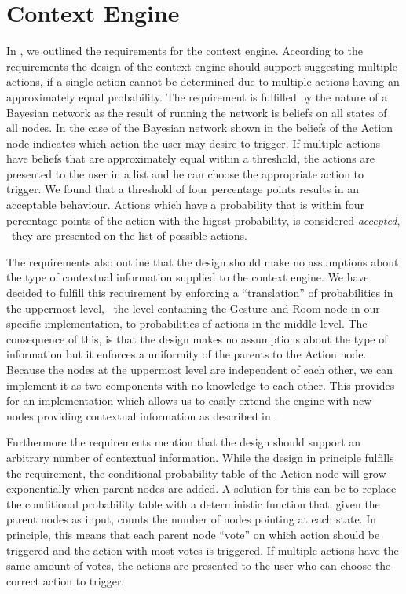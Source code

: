 \section{Context Engine}
\label{sec:design:context-engine}

In , we outlined the requirements for the context engine. According to the requirements the design of the context engine should support suggesting multiple actions, if a single action cannot be determined due to multiple actions having an approximately equal probability. The requirement is fulfilled by the nature of a Bayesian network as the result of running the network is beliefs on all states of all nodes. In the case of the Bayesian network shown in  the beliefs of the Action node indicates which action the user may desire to trigger.
If multiple actions have beliefs that are approximately equal within a threshold, the actions are presented to the user in a list and he can choose the appropriate action to trigger. We found that a threshold of four percentage points results in an acceptable behaviour. Actions which have a probability that is within four percentage points of the action with the higest probability, is considered \emph{accepted}, \ie~they are presented on the list of possible actions.

The requirements also outline that the design should make no assumptions about the type of contextual information supplied to the context engine. We have decided to fulfill this requirement by enforcing a ``translation'' of probabilities in the uppermost level, \ie~the level containing the Gesture and Room node in our specific implementation, to probabilities of actions in the middle level.
The consequence of this, is that the design makes no assumptions about the type of information but it enforces a uniformity of the parents to the Action node.
Because the nodes at the uppermost level are independent of each other, we can implement it as two components with no knowledge to each other. This provides for an implementation which allows us to easily extend the engine with new nodes providing contextual information as described in .

Furthermore the requirements mention that the design should support an arbitrary number of contextual information. While the design in principle fulfills the requirement, the conditional probability table of the Action node will grow exponentially when parent nodes are added.
A solution for this can be to replace the conditional probability table with a deterministic function that, given the parent nodes as input, counts the number of nodes pointing at each state. In principle, this means that each parent node ``vote'' on which action should be triggered and the action with most votes is triggered. If multiple actions have the same amount of votes, the actions are presented to the user who can choose the correct action to trigger.

